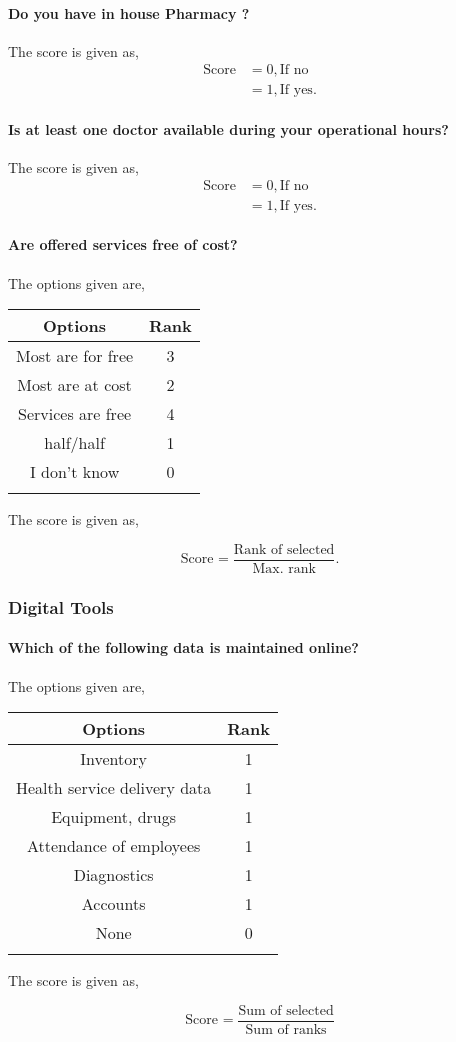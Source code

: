 \documentclass[oneside]{article}
\newcommand{\tsub}[2]{\text{#1}_{\text{#2}}}
\newcommand{\dsub}[2]{\dfrac{\text{#1}}{\text{#2}}}
\newcommand{\multsel}[1]
{
	\[
		\tsub{Score}{#1} = \dsub{Sum of selected}{Sum of ranks}
	\]
}
\newcommand{\singsel}[1]
{
	\[
		\tsub{Score}{#1} = \dsub{Rank of selected}{Max. rank}.
	\]
}
\newenvironment{ttable}
{
\begin{center}
\begin{tabular}{c|c}
\hline
}
{
\\ \hline
\end{tabular}
\end{center}
}
\begin{document}
\paragraph{ Do you have in house Pharmacy ?}

The score is given as,
\begin{align*}
\tsub{Score}{} &= 0, \text{If no} \\
        &= 1, \text{If yes}.
\end{align*}
\paragraph{ Is at least one doctor available during your operational hours?}

The score is given as,
\begin{align*}
\tsub{Score}{} &= 0, \text{If no} \\
        &= 1, \text{If yes}.
\end{align*}
\paragraph{ Are offered services free of cost?}

The options given are,
\begin{ttable}
Options & Rank \\ \hline
Most are for free & 3 \\
Most are at cost & 2 \\
Services are free & 4 \\
half/half & 1 \\
I don't know & 0 \\
\hline
\end{ttable}
The score is given as,
\singsel{}
\subsubsection{Digital Tools}

\paragraph{ Which of the following data is maintained online?}

The options given are,
\begin{ttable}
Options & Rank \\ \hline
Inventory & 1 \\
Health service delivery data & 1 \\
Equipment, drugs & 1 \\
Attendance of employees & 1 \\
Diagnostics & 1 \\
Accounts & 1 \\
None & 0 \\
\hline
\end{ttable}
The score is given as,
\multsel{}
\end{document}
